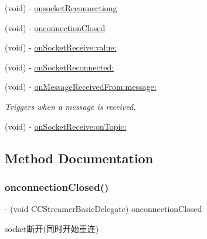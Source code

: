 \begin{DoxyCompactItemize}
(void) -\/ \hyperlink{protocol_c_c_streamer_basic_delegate_01-p_ad1090b742e1d20af99be0f8ebed47b6f}{onsocket\+Reconnectiong}
\item 
(void) -\/ \hyperlink{protocol_c_c_streamer_basic_delegate_01-p_a8714a6fa4b28d423361e87854814b4c2}{onconnection\+Closed}
\item 
(void) -\/ \hyperlink{protocol_c_c_streamer_basic_delegate_01-p_a6889efeda04e7e30b77daf959827ac2b}{on\+Socket\+Receive\+:value\+:}
\item 
(void) -\/ \hyperlink{protocol_c_c_streamer_basic_delegate_01-p_a2d5dfc3d81b55b1881c88d5f8519f5b6}{on\+Socket\+Reconnected\+:}
\item 
(void) -\/ \hyperlink{protocol_c_c_streamer_basic_delegate_01-p_a2553ec838f30f1bd18e971b5aa662301}{on\+Message\+Received\+From\+:message\+:}
\begin{DoxyCompactList}\small\item\em Triggers when a message is received. \end{DoxyCompactList}\item 
(void) -\/ \hyperlink{protocol_c_c_streamer_basic_delegate_01-p_a3ecf04cae96a0e71573b22653bf7997e}{on\+Socket\+Receive\+:on\+Topic\+:}
\end{DoxyCompactItemize}


\subsection{Method Documentation}
\mbox{\label{protocol_c_c_streamer_basic_delegate_01-p_a8714a6fa4b28d423361e87854814b4c2}} 
\subsubsection{\texorpdfstring{onconnection\+Closed()}{onconnectionClosed()}}
{\footnotesize\ttfamily -\/ (void C\+C\+Streamer\+Basic\+Delegate) onconnection\+Closed \begin{DoxyParamCaption}{ }\end{DoxyParamCaption}\hspace{0.3cm}{\ttfamily [optional]}}

socket断开(同时开始重连) \mbox{\label{protocol_c_c_streamer_basic_delegate_01-p_abb23bf11b723a0639c7b3f549f1c1541}} 
